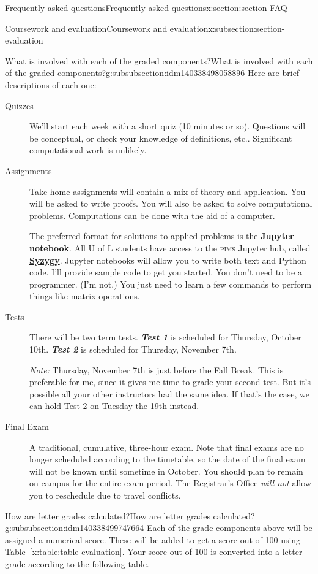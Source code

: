 \documentclass[oneside,10pt,]{article}
\newcommand{\initialism}[1]{\textsc{\MakeLowercase{#1}}}
\newcommand{\alert}[1]{\textbf{\textit{#1}}}
\newcommand{\terminology}[1]{\textbf{#1}}
\begin{document}
\begin{sectionptx}{Frequently asked questions}{}{Frequently asked questions}{}{}{x:section:section-FAQ}
\begin{subsectionptx}{Coursework and evaluation}{}{Coursework and evaluation}{}{}{x:subsection:section-evaluation}
\begin{subsubsectionptx}{What is involved with each of the graded components?}{}{What is involved with each of the graded components?}{}{}{g:subsubsection:idm140338498058896}
Here are brief descriptions of each one:%
\begin{description}
\item[{Quizzes}]We'll start each week with a short quiz (10 minutes or so). Questions will be conceptual, or check your knowledge of definitions, etc.\@. Significant computational work is unlikely.%
\item[{Assignments}]Take-home assignments will contain a mix of theory and application. You will be asked to write proofs. You will also be asked to solve computational problems. Computations can be done with the aid of a computer.%
\par
The preferred format for solutions to applied problems is the \terminology{Jupyter notebook}. All U of L students have access to the \initialism{PIMS} Jupyter hub, called \href{https://uleth.syzygy.ca}{\terminology{Syzygy}}. Jupyter notebooks will allow you to write both text and Python code. I'll provide sample code to get you started. You don't need to be a programmer. (I'm not.) You just need to learn a few commands to perform things like matrix operations.%
\item[{Tests}]There will be two term tests. \alert{Test 1} is scheduled for Thursday, October 10th. \alert{Test 2} is scheduled for Thursday, November 7th.%
\par
\emph{Note:} Thursday, November 7th is just before the Fall Break. This is preferable for me, since it gives me time to grade your second test. But it's possible all your other instructors had the same idea. If that's the case, we can hold Test 2 on Tuesday the 19th instead.%
\item[{Final Exam}]A traditional, cumulative, three-hour exam. Note that final exams are no longer scheduled according to the timetable, so the date of the final exam will not be known until sometime in October. You should plan to remain on campus for the entire exam period. The Registrar's Office \emph{will not} allow you to reschedule due to travel conflicts.%
\end{description}
%
\end{subsubsectionptx}
%
%
\typeout{************************************************}
\typeout{************************************************}
%
\begin{subsubsectionptx}{How are letter grades calculated?}{}{How are letter grades calculated?}{}{}{g:subsubsection:idm140338499747664}
Each of the grade components above will be assigned a numerical score. These will be added to get a score out of 100 using \hyperref[x:table:table-evaluation]{Table~\ref{x:table:table-evaluation}}. Your score out of 100 is converted into a letter grade according to the following table.%

\end{subsubsectionptx}
\end{subsectionptx}
\end{sectionptx}
\end{document}
